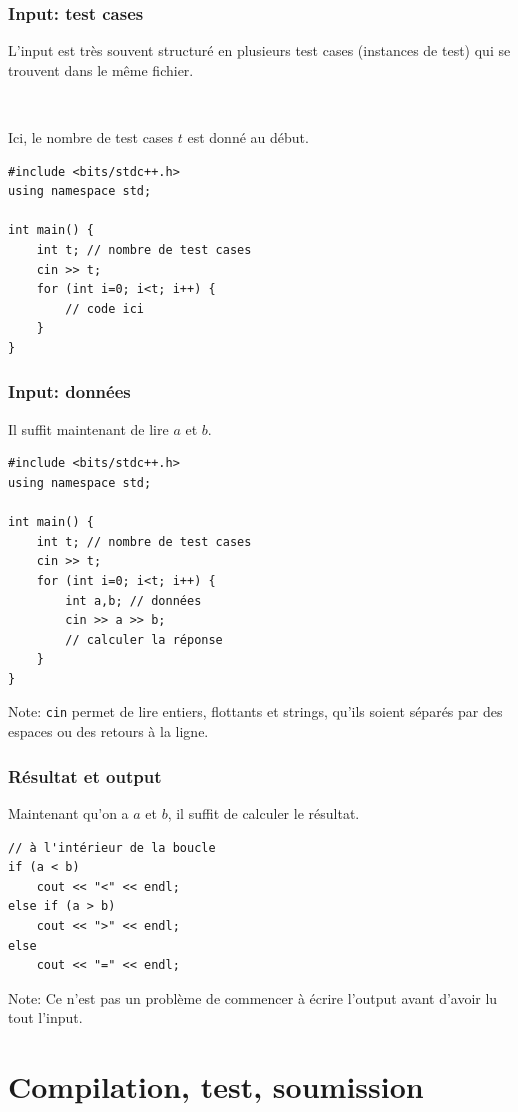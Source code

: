 \documentclass[12pt]{beamer}
\begin{document}
\begin{frame}[fragile]
\frametitle{Input: test cases}
L'input est très souvent structuré en plusieurs test cases (instances de test) qui se trouvent dans le même fichier.

~

Ici, le nombre de test cases $t$ est donné au début.
\begin{lstlisting}
#include <bits/stdc++.h>
using namespace std;

int main() {
    int t; // nombre de test cases
    cin >> t;
    for (int i=0; i<t; i++) {
        // code ici
    }
}
\end{lstlisting}
\end{frame}

\begin{frame}[fragile]
\frametitle{Input: données}
Il suffit maintenant de lire $a$ et $b$.
\begin{lstlisting}
#include <bits/stdc++.h>
using namespace std;

int main() {
    int t; // nombre de test cases
    cin >> t;
    for (int i=0; i<t; i++) {
        int a,b; // données
        cin >> a >> b;
        // calculer la réponse
    }
}
\end{lstlisting}
Note: \lstinline|cin| permet de lire entiers, flottants et strings, qu'ils soient séparés par des espaces ou des retours à la ligne.
\end{frame}

\begin{frame}[fragile]
\frametitle{Résultat et output}
Maintenant qu'on a $a$ et $b$, il suffit de calculer le résultat.
\begin{lstlisting}
// à l'intérieur de la boucle
if (a < b)
    cout << "<" << endl;
else if (a > b)
    cout << ">" << endl;
else
    cout << "=" << endl;
\end{lstlisting}
Note: Ce n'est pas un problème de commencer à écrire l'output avant d'avoir lu tout l'input.
\end{frame}


\section{Compilation, test, soumission}
\end{document}
